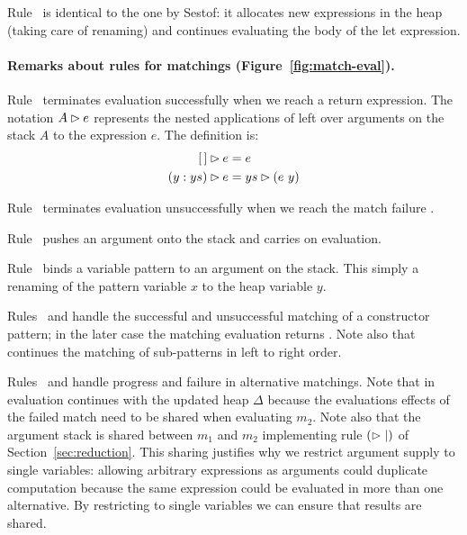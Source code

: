   Rule~ is identical to the one by Sestof: it allocates
  new expressions in the heap (taking care of renaming) and
  continues evaluating the body of the let expression.
  
  \paragraph{Remarks about rules for matchings (Figure~\ref{fig:match-eval}).}

  Rule~ terminates evaluation successfully
  when we reach a return expression.
  The notation $A\rhd e$ represents the nested applications
  of  left over arguments on the stack $A$ to the expression $e$. The definition is:
  \begin{align*}
  [\,]\rhd e &= e \\
  (y:ys)\rhd e  &= ys\rhd (e~y)
  \end{align*}

  Rule~ terminates evaluation unsuccessfully when
  we reach the match failure \matchfail.

  Rule~ pushes an argument onto the stack and carries
  on evaluation.
  
  Rule~ binds a variable pattern to
  an argument on the stack. This simply a renaming of the pattern
  variable $x$ to the heap variable $y$.
  
  Rules~ and  handle the successful
  and unsuccessful matching of a constructor pattern; in the later
  case the matching evaluation returns \matchfail.  Note also that
   continues the matching of sub-patterns in left to
  right order.
  

  Rules~ and  handle progress and failure
  in alternative matchings.  Note that in  evaluation
  continues with the updated heap $\Delta$ because the evaluations
  effects of the failed match need to be shared when evaluating $m_2$.
  Note also that the argument stack is shared between $m_1$ and $m_2$
  implementing rule $(\rhd\mid)$ of Section~\ref{sec:reduction}.
  This sharing justifies why we restrict argument supply to single
  variables: allowing arbitrary expressions as arguments could
  duplicate computation because the same expression could be evaluated
  in more than one alternative. By restricting to single variables
  we can ensure that results are shared.
    
    
